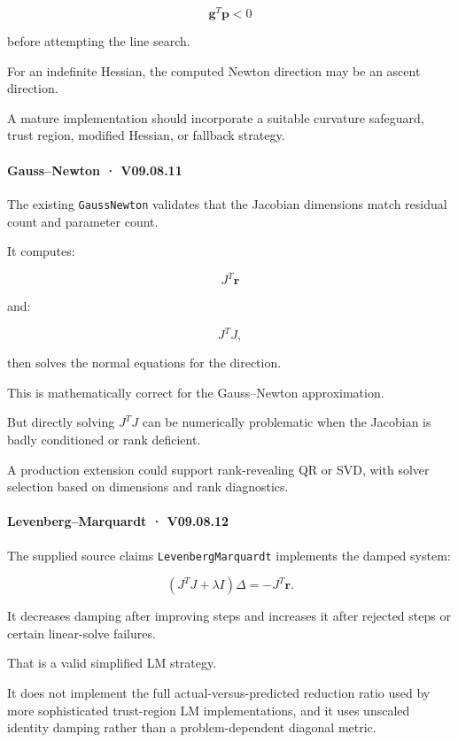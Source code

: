 \[
\mathbf g^T\mathbf p<0
\]

before attempting the line search.

For an indefinite Hessian, the computed Newton direction may be an ascent direction.

A mature implementation should incorporate a suitable curvature safeguard, trust region, modified Hessian, or fallback strategy.

\paragraph{Gauss--Newton · V09.08.11}\label{02-foundations-ii-ch028-gaussnewton-v09.08.11}

The existing \texttt{GaussNewton} validates that the Jacobian dimensions match residual count and parameter count.

It computes:

\[
J^T\mathbf r
\]

and:

\[
J^TJ,
\]

then solves the normal equations for the direction.

This is mathematically correct for the Gauss--Newton approximation.

But directly solving \(J^TJ\) can be numerically problematic when the Jacobian is badly conditioned or rank deficient.

A production extension could support rank-revealing QR or SVD, with solver selection based on dimensions and rank diagnostics.

\paragraph{Levenberg--Marquardt · V09.08.12}\label{02-foundations-ii-ch028-levenbergmarquardt-v09.08.12}

The supplied source claims \texttt{LevenbergMarquardt} implements the damped system:

\[
(J^TJ+\lambda I)\Delta=-J^T\mathbf r.
\]

It decreases damping after improving steps and increases it after rejected steps or certain linear-solve failures.

That is a valid simplified LM strategy.

It does not implement the full actual-versus-predicted reduction ratio used by more sophisticated trust-region LM implementations, and it uses unscaled identity damping rather than a problem-dependent diagonal metric.

